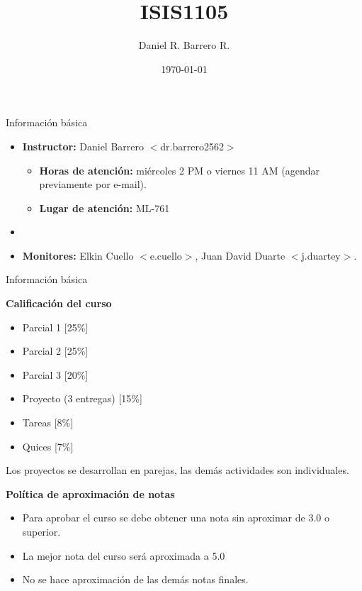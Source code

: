 \documentclass{beamer}
\title{ISIS1105}
\author{Daniel R. Barrero R.}
\institute{Universidad de los Andes}
\date{\today}
\begin{document}
\frame{\titlepage}

%

\begin{frame}{Información básica}

\begin{itemize}
    \item \textbf{Instructor:} Daniel Barrero $<$dr.barrero2562$>$ \pause
    \begin{itemize}
        \item \textbf{Horas de atención:} miércoles 2 PM o viernes 11 AM (agendar previamente por e-mail).
        \item \textbf{Lugar de atención:} ML-761
    \end{itemize}
    \item[ ]\pause
    \item \textbf{Monitores:} Elkin Cuello $<$e.cuello$>$, Juan David Duarte $<$j.duartey$>$.
\end{itemize}
    
\end{frame}

%

\begin{frame}{Información básica}

\textbf{Calificación del curso} \pause

\begin{itemize}
    \item Parcial 1 [25\%]
    \item Parcial 2 [25\%]
    \item Parcial 3 [20\%] \pause
    \item Proyecto (3 entregas) [15\%] \pause
    \item Tareas [8\%]
    \item Quices [7\%]
\end{itemize}

Los proyectos se desarrollan en parejas, las demás actividades son individuales. \\

\bigskip

\textbf{Política de aproximación de notas} \pause

\begin{itemize}
    \item Para aprobar el curso se debe obtener una nota sin aproximar de 3.0 o superior. \pause
    \item La mejor nota del curso será aproximada a 5.0 \pause
    \item No se hace aproximación de las demás notas finales. \pause
\end{itemize}
    
\end{frame}
\end{document}

